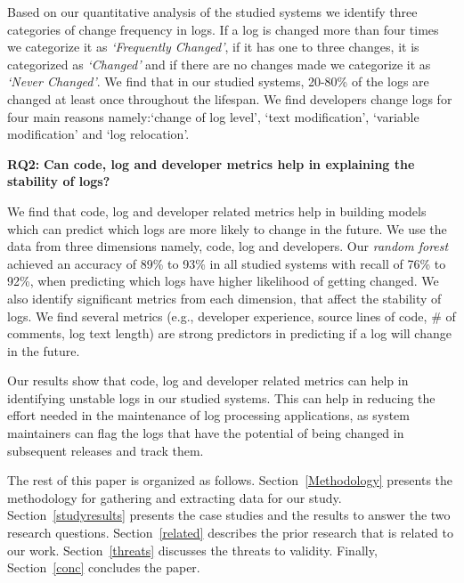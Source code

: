 Based on our quantitative analysis of the studied systems we identify three categories of change frequency in logs. If a log is changed more than four times we categorize it as \textsl{`Frequently Changed'}, if it has one to three changes, it is categorized as \textsl{`Changed'} and if there are no changes made we categorize it as \textsl{`Never Changed'}. We find that in our studied systems, 20-80\% of the logs are changed at least once throughout the lifespan. We find developers change logs for four main reasons namely:`change of log level', `text modification', `variable modification' and `log relocation'.


\textbf{RQ2:} \textbf{Can code, log and developer metrics help in explaining the stability of logs?}

 We find that code, log and developer related metrics help in building models which can predict which logs are more likely to change in the future. We use the data from three dimensions namely, code, log and developers. Our \textsl{random forest} achieved an accuracy of 89\% to 93\% in all studied systems with recall of 76\% to 92\%, when predicting which logs have higher likelihood of getting changed. We also identify significant metrics from each dimension, that affect the stability of logs. We find several metrics (e.g., developer experience, source lines of code, \# of comments, log text length) are strong predictors in predicting if a log will change in the future. 
 
 
 Our results show that code, log and developer related metrics can help in identifying unstable logs in our studied systems. This can help in reducing the effort needed in the maintenance of log processing applications, as system maintainers can flag the logs that have the potential of being changed in subsequent releases and track them. 
 
The rest of this paper is organized as follows. Section~\ref{Methodology} presents the methodology for gathering and extracting data for our study. Section~\ref{studyresults} presents the case studies and the results to answer the two research questions. Section~\ref{related} describes the prior research that is related to our work. Section~\ref{threats} discusses the threats to validity. Finally, Section~\ref{conc} concludes the paper.
 
 
